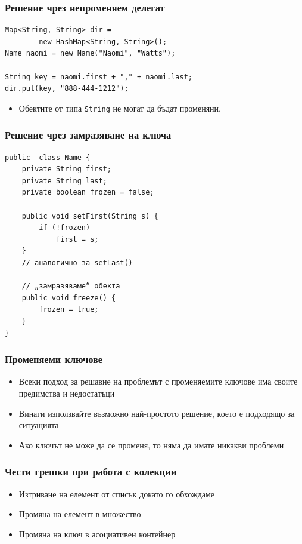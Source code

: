 \documentclass[ignorenonframetext, hyperref=unicode,compress]{beamer}
\begin{document}
\begin{frame}[containsverbatim]\frametitle{Решение чрез непроменяем делегат}
\begin{lstlisting}
Map<String, String> dir = 
		new HashMap<String, String>();
Name naomi = new Name("Naomi", "Watts");

String key = naomi.first + "," + naomi.last;
dir.put(key, "888-444-1212");
\end{lstlisting}
\begin{itemize}
\item Обектите от типа \lstinline{String} не могат да бъдат променяни.
\end{itemize}
\end{frame}


\begin{frame}[containsverbatim]\frametitle{Решение чрез замразяване на ключа}
\begin{lstlisting}
public  class Name {
 	private String first;
 	private String last;
 	private boolean frozen = false; 

 	public void setFirst(String s) {
 		if (!frozen) 
 			first = s;
	}
 	// аналогично за setLast()

 	// „замразяваме“ обекта
 	public void freeze() {
 		frozen = true;
	}
}
\end{lstlisting}
\end{frame}

\begin{frame}[containsverbatim]\frametitle{Променяеми ключове}
\begin{itemize}
\item Всеки подход за решавне на проблемът с променяемите ключове има своите предимства и недостатъци
\item Винаги използвайте възможно най-простото решение, което е подходящо за ситуацията
\item Ако ключът не може да се променя, то няма да имате никакви проблеми
\end{itemize}
\end{frame}


\begin{frame}[containsverbatim]\frametitle{Чести грешки при работа с колекции}
\begin{itemize}
\item Изтриване на елемент от списък докато го обхождаме
\item Промяна на елемент в множество
\item Промяна на ключ в асоциативен контейнер
\end{itemize}
\end{frame}
\end{document}
